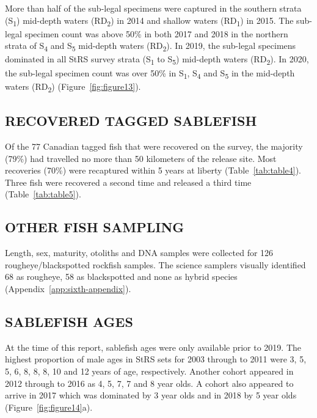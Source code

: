\documentclass[12pt]{article}\usepackage[]{graphicx}\usepackage[]{color}
\begin{document}
More than half of the sub-legal specimens were captured in the southern strata (S\textsubscript{1}) mid-depth waters (RD\textsubscript{2}) in 2014 and shallow waters (RD\textsubscript{1}) in 2015. The sub-legal specimen count was above 50\% in both 2017 and 2018 in the northern strata of S\textsubscript{4} and S\textsubscript{5} mid-depth waters (RD\textsubscript{2}). In 2019, the sub-legal specimens dominated in all StRS survey strata (S\textsubscript{1} to S\textsubscript{5}) mid-depth waters (RD\textsubscript{2}). In 2020, the sub-legal specimen count was over 50\% in S\textsubscript{1}, S\textsubscript{4} and S\textsubscript{5} in the mid-depth waters (RD\textsubscript{2}) (Figure~\ref{fig:figure13}).

\hypertarget{recovered-tagged-sablefish}{%
\subsection{RECOVERED TAGGED SABLEFISH}\label{recovered-tagged-sablefish}}

Of the 77 Canadian tagged fish that were recovered on the survey, the majority (79\%) had travelled no more than 50 kilometers of the release site. Most recoveries (70\%) were recaptured within 5 years at liberty (Table~\ref{tab:table4}). Three fish were recovered a second time and released a third time (Table~\ref{tab:table5}).

\hypertarget{other-fish-sampling}{%
\subsection{OTHER FISH SAMPLING}\label{other-fish-sampling}}

Length, sex, maturity, otoliths and DNA samples were collected for 126 rougheye/blackspotted rockfish samples. The science samplers visually identified 68 as rougheye, 58 as blackspotted and none as hybrid species (Appendix~\ref{app:sixth-appendix}).

\hypertarget{sablefish-ages}{%
\subsection{SABLEFISH AGES}\label{sablefish-ages}}

At the time of this report, sablefish ages were only available prior to 2019. The highest proportion of male ages in StRS sets for 2003 through to 2011 were 3, 5, 5, 6, 8, 8, 8, 10 and 12 years of age, respectively. Another cohort appeared in 2012 through to 2016 as 4, 5, 7, 7 and 8 year olds. A cohort also appeared to arrive in 2017 which was dominated by 3 year olds and in 2018 by 5 year olds (Figure~\ref{fig:figure14}a).
\end{document}
